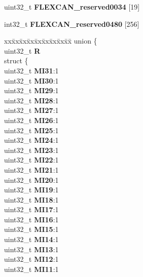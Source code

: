 \begin{DoxyCompactItemize}
\begin{tabbing}
\end{tabbing}\item 
\mbox{\label{structFLEXCAN2__tag_a4ad7b3e0156b8b656c2545db1ac76a98}} 
uint32\+\_\+t {\bfseries F\+L\+E\+X\+C\+A\+N\+\_\+reserved0034} \mbox{[}19\mbox{]}
\item 
\mbox{\label{structFLEXCAN2__tag_a5a6cf7c8839026e59fd25f081a134dbb}} 
int32\+\_\+t {\bfseries F\+L\+E\+X\+C\+A\+N\+\_\+reserved0480} \mbox{[}256\mbox{]}
\item 
\mbox{\label{structFLEXCAN2__tag_ac189a16630fdb092882b046be7f40ca9}} 
\begin{tabbing}
xx\=xx\=xx\=xx\=xx\=xx\=xx\=xx\=xx\=\kill
union \{\\
\>uint32\_t {\bfseries R}\\
\>struct \{\\
\>\>uint32\_t {\bfseries MI31}:1\\
\>\>uint32\_t {\bfseries MI30}:1\\
\>\>uint32\_t {\bfseries MI29}:1\\
\>\>uint32\_t {\bfseries MI28}:1\\
\>\>uint32\_t {\bfseries MI27}:1\\
\>\>uint32\_t {\bfseries MI26}:1\\
\>\>uint32\_t {\bfseries MI25}:1\\
\>\>uint32\_t {\bfseries MI24}:1\\
\>\>uint32\_t {\bfseries MI23}:1\\
\>\>uint32\_t {\bfseries MI22}:1\\
\>\>uint32\_t {\bfseries MI21}:1\\
\>\>uint32\_t {\bfseries MI20}:1\\
\>\>uint32\_t {\bfseries MI19}:1\\
\>\>uint32\_t {\bfseries MI18}:1\\
\>\>uint32\_t {\bfseries MI17}:1\\
\>\>uint32\_t {\bfseries MI16}:1\\
\>\>uint32\_t {\bfseries MI15}:1\\
\>\>uint32\_t {\bfseries MI14}:1\\
\>\>uint32\_t {\bfseries MI13}:1\\
\>\>uint32\_t {\bfseries MI12}:1\\
\>\>uint32\_t {\bfseries MI11}:1\\

\end{tabbing}
\end{DoxyCompactItemize}
